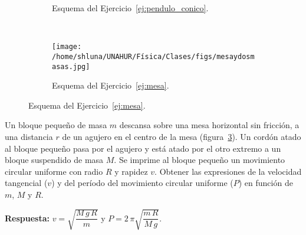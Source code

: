 \documentclass[addpoints]{exam}
\newcommand{\rta}{\textbf{Respuesta: }}
\begin{document}
\begin{questions}
    \begin{figure}[ht]
        \centering
        \begin{subfigure}{0.45\textwidth}
            \centering
            \caption{Esquema del Ejercicio~\ref{ej:pendulo_conico}.}
        \label{fig:pendiloconico}
        \end{subfigure}
        ~
        \begin{subfigure}{0.45\textwidth}
            \centering
            \texttt{[image: /home/shluna/UNAHUR/Física/Clases/figs/mesaydosmasas.jpg]}
            \caption{Esquema del Ejercicio~\ref{ej:mesa}.}
            \label{fig:mesa}
        \end{subfigure}        
    \end{figure}

    \question Un bloque pequeño de masa $m$ descansa sobre una mesa horizontal sin fricción, a una distancia $r$ de un agujero en el centro de la mesa (figura~\ref{fig:mesa}). Un cordón atado al bloque pequeño pasa por el agujero y está atado por el otro extremo a un bloque suspendido de masa $M$. Se imprime al bloque pequeño un movimiento circular uniforme con radio $R$ y rapidez $v$. Obtener las expresiones de la velocidad tangencial ($v$) y del período del movimiento circular uniforme ($P$) en función de $m$, $M$ y $R$. \label{ej:mesa}

    \rta $v = \sqrt{\dfrac{M \, g \, R}{m}}$ y $P = 2 \, \pi \sqrt{\dfrac{m \, R}{M \, g}}$.


\end{questions}
\end{document}
